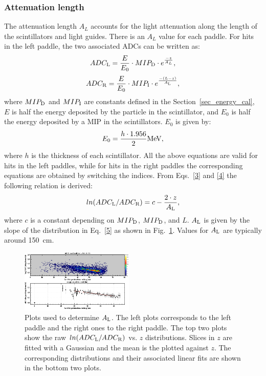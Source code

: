 \subsubsection{Attenuation length }

The attenuation length $A_{L}$ accounts for the light attenuation along the length of the scintillators and light guides. There is an $A_{L}$ value for each paddle.
%
For hits in the left paddle, the two associated ADCs can be written as:
\begin{equation}
\label{3}
ADC_{\rm{L}}=\frac{E}{E_0}\cdot MIP_{\rm{D}}\cdot e^{\frac{-z}{A_{L}}},
\end{equation}
\begin{equation}
\label{4}
ADC_{\rm{R}}=\frac{E}{E_0}\cdot MIP_{\rm{I}}\cdot e^{\frac{-(L-z)}{A_{\rm{L}}}},
\end{equation}
where $MIP_{\rm{D}}$ and $MIP_{\rm{I}}$ are constants defined in the Section~\ref{sec_energy_cal}, $E$ is half the energy deposited by the particle in the scintillator, and $E_0$ is half the energy deposited by a MIP in the scintillators.
$E_0$ is given by:
\begin{equation}\label{eq_def_e0}
E_0=\frac{h\cdot 1.956}{2} \rm{MeV},
\end{equation}
where $h$ is the thickness of each scintillator.
All the above equations are valid for hits in the left paddles, while for hits in the right paddles the corresponding equations are obtained by switching the indices.
From Eqs.~\ref{3} and \ref{4} the following relation is derived:
\begin{equation}
\label{5}
ln(ADC_{\rm{L}}/ADC_{\rm{R}})=c-\frac{2\cdot z}{A_{\rm{L}}},
\end{equation}
where $c$ is a constant depending on $MIP_{\rm{D}}$, $MIP_{\rm{D}}$, and $L$. $A_{\rm{L}}$ is given by the slope of the distribution in Eq.~\ref{5} as shown in Fig.~\ref{attl}. Values for $A_{\rm{L}}$ are typically around 150~cm.

\begin{figure}[htb]
\begin{center}
\includegraphics[width=0.48\textwidth]{Figure/attl1.png} 
\end{center}
\caption{Plots used to determine $A_{\rm{L}}$. The left plots corresponds to the left paddle and the right ones to the right paddle. The top two plots show the raw $ln(ADC_{\rm{L}}/ADC_{\rm{R}})$ vs. $z$ distributions. Slices in $z$ are fitted with a Gaussian and the mean is the plotted against $z$. The corresponding distributions and their associated linear fits are shown in the bottom two plots.}
\label{attl}
\end{figure}

